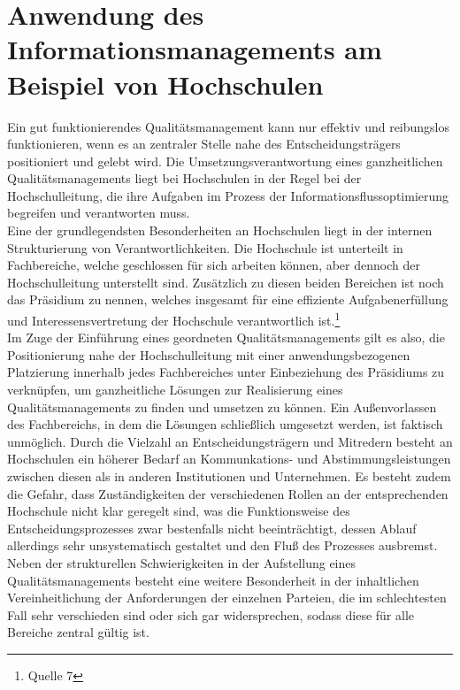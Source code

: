 \section{Anwendung des Informationsmanagements am Beispiel von Hochschulen}
Ein gut funktionierendes Qualitätsmanagement kann nur effektiv und reibungslos funktionieren, wenn es an zentraler Stelle nahe des Entscheidungsträgers positioniert und gelebt wird. Die Umsetzungsverantwortung eines ganzheitlichen Qualitätsmanagements liegt bei Hochschulen in der Regel bei der Hochschulleitung, die ihre Aufgaben im Prozess der Informationsflussoptimierung begreifen und verantworten muss.\\

Eine der grundlegendsten Besonderheiten an Hochschulen liegt in der internen Strukturierung von Verantwortlichkeiten. Die Hochschule ist unterteilt in Fachbereiche, welche geschlossen für sich arbeiten können, aber dennoch der Hochschulleitung unterstellt sind. Zusätzlich zu diesen beiden Bereichen ist noch das Präsidium zu nennen, welches insgesamt für eine effiziente Aufgabenerfüllung und Interessensvertretung der Hochschule verantwortlich ist.\footnote{Quelle 7}\\

Im Zuge der Einführung eines geordneten Qualitätsmanagements gilt es also, die Positionierung nahe der Hochschulleitung mit einer anwendungsbezogenen Platzierung innerhalb jedes Fachbereiches unter Einbeziehung des Präsidiums zu verknüpfen, um ganzheitliche Lösungen zur Realisierung eines Qualitätsmanagements zu finden und umsetzen zu können. Ein Außenvorlassen des Fachbereichs, in dem die Lösungen schließlich umgesetzt werden, ist faktisch unmöglich. Durch die Vielzahl an Entscheidungsträgern und Mitredern besteht an Hochschulen ein höherer Bedarf an Kommunkations- und Abstimmungsleistungen zwischen diesen als in anderen Institutionen und Unternehmen. Es besteht zudem die Gefahr, dass Zuständigkeiten der verschiedenen Rollen an der entsprechenden Hochschule nicht klar geregelt sind, was die Funktionsweise des Entscheidungsprozesses zwar bestenfalls nicht beeinträchtigt, dessen Ablauf allerdings sehr unsystematisch gestaltet und den Fluß des Prozesses ausbremst.\\

Neben der strukturellen Schwierigkeiten in der Aufstellung eines Qualitätsmanagements besteht eine weitere Besonderheit in der inhaltlichen Vereinheitlichung der Anforderungen der einzelnen Parteien, die im schlechtesten Fall sehr verschieden sind oder sich gar widersprechen, sodass diese für alle Bereiche zentral gültig ist.\\

